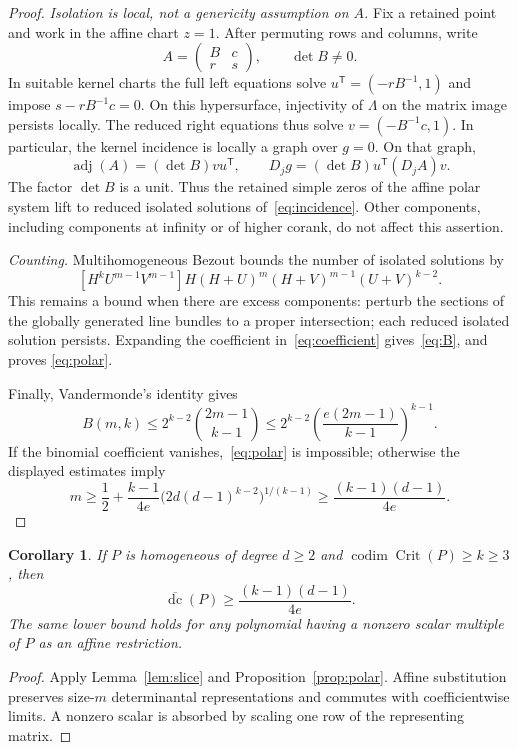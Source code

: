 \documentclass[11pt]{article}
\newtheorem{corollary}[theorem]{Corollary}
\theoremstyle{remark}\newtheorem{remark}[theorem]{Remark}
\DeclareMathOperator{\Crit}{Crit}
\DeclareMathOperator{\codim}{codim}
\DeclareMathOperator{\dc}{dc}
\DeclareMathOperator{\adj}{adj}
\newcommand{\bdc}{\overline{\dc}}
\begin{document}
\begin{proof}
\emph{Isolation is local, not a genericity assumption on $A$.}
Fix a retained point and work in the affine chart $z=1$. After
permuting rows and columns, write
\[
 A=\begin{pmatrix}B&c\\ r&s\end{pmatrix},\qquad \det B\ne0.
\]
In suitable kernel charts the full left equations solve
$u^{\mathsf T}=(-rB^{-1},1)$ and impose $s-rB^{-1}c=0$.
On this hypersurface, injectivity of $\Lambda$ on the matrix image
persists locally. The reduced right equations thus solve
$v=(-B^{-1}c,1)$. In particular, the kernel incidence is locally a
graph over $g=0$. On that graph,
\[
 \adj(A)=(\det B)vu^{\mathsf T},\qquad
 D_jg=(\det B)u^{\mathsf T}(D_jA)v.
\]
The factor $\det B$ is a unit. Thus the retained simple zeros of the
affine polar system lift to reduced isolated solutions
of~\eqref{eq:incidence}. Other components, including components at
infinity or of higher corank, do not affect this assertion.

\emph{Counting.}
Multihomogeneous Bezout bounds the number of isolated solutions by
\begin{equation}\label{eq:coefficient}
 [H^kU^{m-1}V^{m-1}]
 H(H+U)^m(H+V)^{m-1}(U+V)^{k-2}.
\end{equation}
This remains a bound when there are excess components: perturb the
sections of the globally generated line bundles to a proper
intersection; each reduced isolated solution persists. Expanding the
coefficient in~\eqref{eq:coefficient} gives~\eqref{eq:B}, and proves
\eqref{eq:polar}.

Finally, Vandermonde's identity gives
\[
 B(m,k)\le 2^{k-2}\binom{2m-1}{k-1}
 \le 2^{k-2}\left(\frac{e(2m-1)}{k-1}\right)^{k-1}.
\]
If the binomial coefficient vanishes,~\eqref{eq:polar} is impossible;
otherwise the displayed estimates imply
\[
 m\ge\frac12+\frac{k-1}{4e}
       \bigl(2d(d-1)^{k-2}\bigr)^{1/(k-1)}
 \ge\frac{(k-1)(d-1)}{4e}.
\]
\end{proof}

\begin{corollary}\label{cor:codim}
If $P$ is homogeneous of degree $d\ge2$ and
$\codim\Crit(P)\ge k\ge3$, then
\[
 \bdc(P)\ge\frac{(k-1)(d-1)}{4e}.
\]
The same lower bound holds for any polynomial having a nonzero scalar
multiple of $P$ as an affine restriction.
\end{corollary}
\begin{proof}
Apply Lemma~\ref{lem:slice} and Proposition~\ref{prop:polar}.
Affine substitution preserves size-$m$ determinantal representations
and commutes with coefficientwise limits. A nonzero scalar is absorbed
by scaling one row of the representing matrix.
\end{proof}
\end{document}
